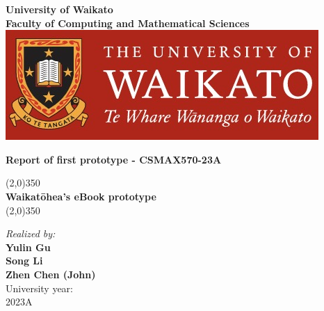 \begin{titlepage}
  \begin{center}
  \thispagestyle{emptyt}
  \textbf{\Large University of Waikato\\[0.07cm]Faculty of Computing and Mathematical Sciences }\\ [0.3cm]
  
  \includegraphics[scale=0.2]{./Images/UoW.jpg}~\\
  
  \vspace{2cm}
  
  \textbf{\Large Report of first prototype - CSMAX570-23A}\\[0.2cm]
  
  \vspace{0.4cm}
  \hspace{0.3cm}
  
  \begin{center}
  \line(2,0){350}\\
  \vspace*{0.5cm} \textbf{{\LARGE{Waikatōhea's eBook prototype}}}\\
  \vspace*{0.5cm}\line(2,0){350}\\
  \end{center}
  
  \hspace{0.7cm}
    
   \large \emph{Realized by:}\\
  \textbf{\Large{Yulin Gu}} \\[0.5cm]
  \textbf{\Large{Song Li}} \\[0.5cm]
  \textbf{\Large{Zhen Chen (John)}} \\[0.5cm]
  
   
  
  \vfill
  {\large University year:}\\
  {\large 2023A}
  
  
  \end{center}
  \end{titlepage}
  